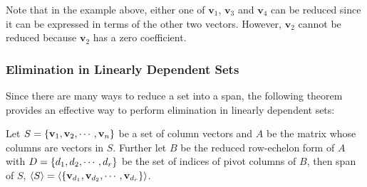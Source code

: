 \documentclass[a4paper,12pt]{article}
\begin{document}
Note that in the example above, either one of $\mathbf{v}_{1}$, $\mathbf{v}_{3}$ and $\mathbf{v}_{4}$ can be reduced since it can be expressed in terms of the other two vectors. However, $\mathbf{v}_{2}$ cannot be reduced because $\mathbf{v}_{2}$ has a zero coefficient.

\subsubsection{Elimination in Linearly Dependent Sets}
Since there are many ways to reduce a set into a span, the following theorem provides an effective way to perform elimination in linearly dependent sets:\n

\begin{thm}
  Let $S=\left\{ \mathbf{v}_{1},\mathbf{v}_{2},\cdots,\mathbf{v}_{n}\right\}$ be a set of column vectors and $A$ be the matrix whose columns are vectors in $S$. Further let $B$ be the reduced row-echelon form of $A$ with $D=\left\{ d_{1},d_{2},\cdots,d_{r}\right\}$ be the set of indices of pivot columns of $B$, then span of $S$, $\left\langle S\right\rangle=\left\langle \left\{ \mathbf{v}_{d_{1}},\mathbf{v}_{d_{2}},\cdots,\mathbf{v}_{d_{r}}\right\}\right\rangle$.
\end{thm}\n
\end{document}

